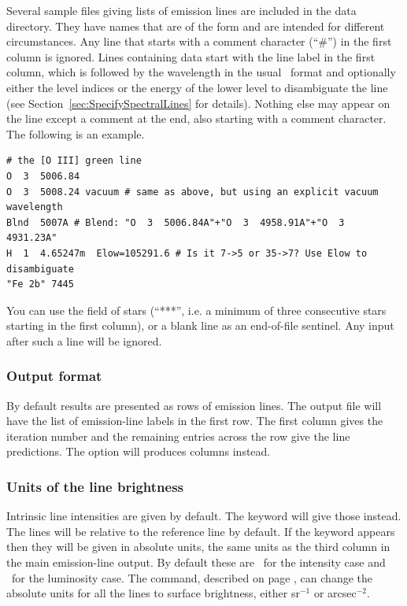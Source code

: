 Several sample
files giving lists of emission lines are included in the data directory.
They have names that are of the form 
and are intended for different circumstances.
Any line that starts with a comment character (``\#'') in the first column is ignored.
Lines containing data start with the line label in the first column,
which is followed by the wavelength in the usual \Cloudy\ format
and optionally either the level indices or the energy of the lower level to disambiguate the line
(see Section~\ref{sec:SpecifySpectralLines} for details).
Nothing else may appear on the line except a comment at the end, also starting with a comment character.
The following is an example.
\begin{verbatim}
# the [O III] green line
O  3  5006.84
O  3  5008.24 vacuum # same as above, but using an explicit vacuum wavelength
Blnd  5007A # Blend: "O  3  5006.84A"+"O  3  4958.91A"+"O  3  4931.23A"
H  1  4.65247m  Elow=105291.6 # Is it 7->5 or 35->7? Use Elow to disambiguate
"Fe 2b" 7445
\end{verbatim}
You can use the field of stars (``***'', i.e. a minimum of three consecutive stars
starting in the first column), or a blank line as an end-of-file sentinel. Any
input after such a line will be ignored.

\subsubsection{Output format}
By default results are presented as rows of emission lines.
The output file will have the list of emission-line labels in the first
row.  The first column gives the iteration number and the remaining
entries across the row give the line predictions.
The  option will produces columns instead.

\subsubsection{Units of the line brightness}
Intrinsic line intensities are given by default.
The keyword  will give those instead.
The lines will be relative to the reference line by default.
If the keyword  appears then they will be given
in absolute units, the same units as the third column in
the main emission-line output.
By default these are \ergpscmps\
for the intensity case and \ergps\ for the luminosity case.
The  command,
described on page \pageref{sec:CommandPrintLineSurfaceBrightness},
can change the absolute units for all the lines to surface brightness,
either sr$^{-1}$ or arcsec$^{-2}$.

